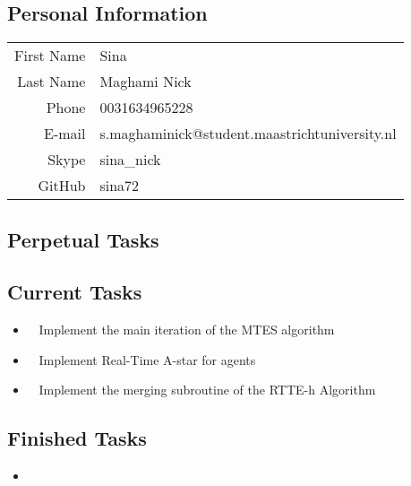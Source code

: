 \subsection{Personal Information}
\begin{table}[h!]
	\begin{tabular}{rl}
	First Name 	& Sina\\
	Last Name	& Maghami Nick\\
	Phone		& 0031634965228\\
	E-mail		& s.maghaminick@student.maastrichtuniversity.nl\\
	Skype		& sina\_nick\\
	GitHub		& sina72
\end{tabular}
\end{table}

\subsection{Perpetual Tasks}

\subsection{Current Tasks}
\begin{itemize}
	\item~
	Implement the main iteration of the MTES algorithm
	\item~
	Implement Real-Time A-star for agents
	\item~
	Implement the merging subroutine of the RTTE-h Algorithm
\end{itemize}

\subsection{Finished Tasks}
\begin{itemize}
	\item 
\end{itemize}